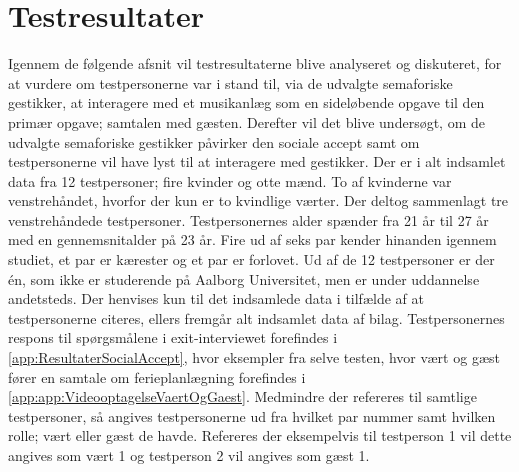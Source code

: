 \chapter{Testresultater}
\label{TestresultaterSocialAccept}
%
Igennem de følgende afsnit vil testresultaterne blive analyseret og diskuteret, for at vurdere om testpersonerne var i stand til, via de udvalgte semaforiske gestikker, at interagere med et musikanlæg som en sideløbende opgave til den primær opgave; samtalen med gæsten. Derefter vil det blive undersøgt, om de udvalgte semaforiske gestikker påvirker den sociale accept samt om testpersonerne vil have lyst til at interagere med gestikker.\blankline
%
Der er i alt indsamlet data fra 12 testpersoner; fire kvinder og otte mænd. To af kvinderne var venstrehåndet, hvorfor der kun er to kvindlige værter. Der deltog sammenlagt tre venstrehåndede testpersoner. Testpersonernes alder spænder fra 21 år til 27 år med en gennemsnitalder på 23 år. Fire ud af seks par kender hinanden igennem studiet, et par er kærester og et par er forlovet. Ud af de 12 testpersoner er der én, som ikke er studerende på Aalborg Universitet, men er under uddannelse andetsteds. Der henvises kun til det indsamlede data i tilfælde af at testpersonerne citeres, ellers fremgår alt indsamlet data af bilag. Testpersonernes respons til spørgsmålene i exit-interviewet forefindes i \autoref{app:ResultaterSocialAccept}, hvor eksempler fra selve testen, hvor vært og gæst fører en samtale om ferieplanlægning forefindes i \autoref{app:app:VideooptagelseVaertOgGaest}. Medmindre der refereres til samtlige testpersoner, så angives testpersonerne ud fra hvilket par nummer samt hvilken rolle; vært eller gæst de havde. Refereres der eksempelvis til testperson 1 vil dette angives som vært 1 og testperson 2 vil angives som gæst 1. 



